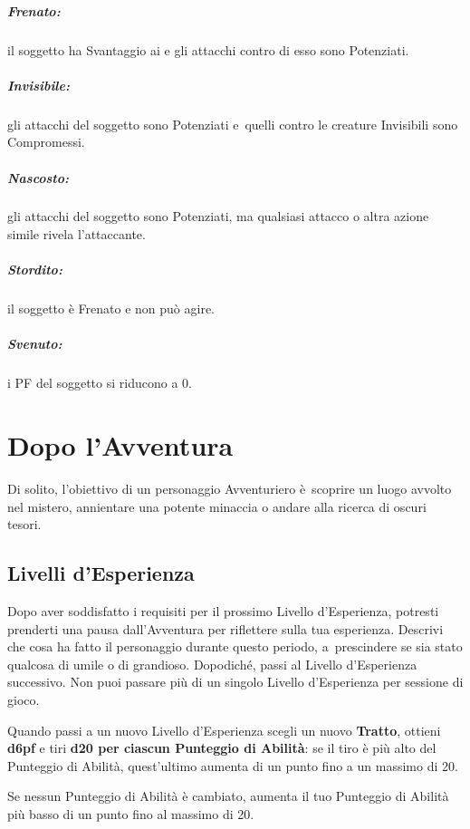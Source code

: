 \documentclass[itdr]{subfiles}
\begin{document}
\vfill
{}
\subparagraph{Frenato:} il soggetto ha Svantaggio ai  e gli attacchi contro di esso sono Potenziati.

\vfill
{}
\subparagraph{Invisibile:} gli attacchi del soggetto sono Potenziati e~quelli contro le creature Invisibili sono Compromessi.

\vfill
{}
\subparagraph{Nascosto:} gli attacchi del soggetto sono Potenziati, ma qualsiasi attacco o altra azione simile rivela l’attaccante.

\vfill
{}
\subparagraph{Stordito:} il soggetto è Frenato e non può agire.

\vfill
{}
\subparagraph{Svenuto:} i PF del soggetto si riducono a 0.

\break

\section{Dopo l'Avventura}

Di solito, l’obiettivo di un personaggio Avventuriero è~scoprire un luogo avvolto nel mistero, annientare una potente minaccia o andare alla ricerca di oscuri tesori.

\vfill
\subsection{Livelli d’Esperienza}
Dopo aver soddisfatto i requisiti per il prossimo Livello d’Esperienza, potresti prenderti una pausa dall’Avventura per riflettere sulla tua esperienza. Descrivi che cosa ha fatto il personaggio durante questo periodo, a~prescindere se sia stato qualcosa di umile o di grandioso. Dopodiché, passi al Livello d’Esperienza successivo. Non puoi passare più di un singolo Livello d’Esperienza per sessione di gioco.

Quando passi a un nuovo Livello d’Esperienza scegli un nuovo \textbf{Tratto}, ottieni \textbf{d6pf} e tiri \textbf{d20 per ciascun Punteggio di Abilità}: se il tiro è più alto del Punteggio di Abilità, quest’ultimo aumenta di un punto fino a un massimo di 20. 

Se nessun Punteggio di Abilità è cambiato, aumenta il tuo Punteggio di Abilità più basso di un punto fino al massimo di 20.
\end{document}
